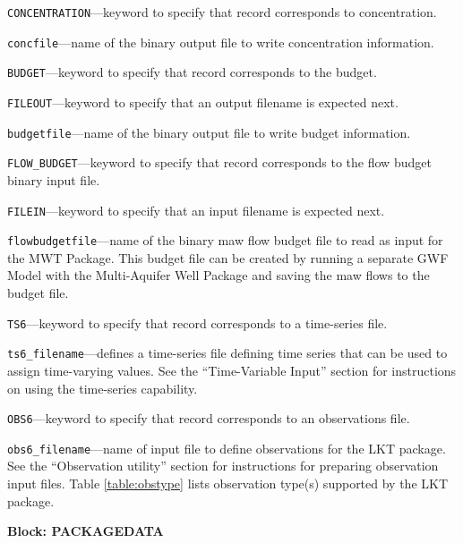 \begin{description}
\item \texttt{CONCENTRATION}---keyword to specify that record corresponds to concentration.

\item \texttt{concfile}---name of the binary output file to write concentration information.

\item \texttt{BUDGET}---keyword to specify that record corresponds to the budget.

\item \texttt{FILEOUT}---keyword to specify that an output filename is expected next.

\item \texttt{budgetfile}---name of the binary output file to write budget information.

\item \texttt{FLOW\_BUDGET}---keyword to specify that record corresponds to the flow budget binary input file.

\item \texttt{FILEIN}---keyword to specify that an input filename is expected next.

\item \texttt{flowbudgetfile}---name of the binary maw flow budget file to read as input for the MWT Package.  This budget file can be created by running a separate GWF Model with the Multi-Aquifer Well Package and saving the maw flows to the budget file.

\item \texttt{TS6}---keyword to specify that record corresponds to a time-series file.

\item \texttt{ts6\_filename}---defines a time-series file defining time series that can be used to assign time-varying values. See the ``Time-Variable Input'' section for instructions on using the time-series capability.

\item \texttt{OBS6}---keyword to specify that record corresponds to an observations file.

\item \texttt{obs6\_filename}---name of input file to define observations for the LKT package. See the ``Observation utility'' section for instructions for preparing observation input files. Table \ref{table:obstype} lists observation type(s) supported by the LKT package.

\end{description}
\item \textbf{Block: PACKAGEDATA}

